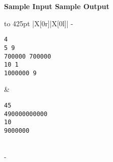 \documentclass[a4paper,11pt]{article}
\begin{document}
\bf{Sample Input} \hspace{44mm} \bf{Sample Output}\vspace{1mm}\\
\begin{tabu*} to 425pt {|X[0r]|X[0l]|}
\tabucline-
\vspace{-\baselineskip} %
\begin{Verbatim}
4
5 9
700000 700000
10 1
1000000 9
\end{Verbatim}
&
\vspace{-\baselineskip} %
\begin{Verbatim}
45
490000000000
10
9000000
\end{Verbatim}
\\
\tabucline-
\end{tabu*}
\end{document}
